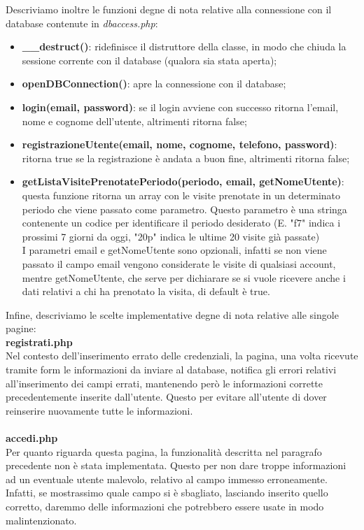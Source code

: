 Descriviamo inoltre le funzioni degne di nota relative alla connessione con il database contenute in \textit{dbaccess.php}:
\begin{itemize}
\item \textbf{\_\_destruct()}: ridefinisce il distruttore della classe, in modo che chiuda la sessione corrente con il database (qualora sia stata aperta);
\item \textbf{openDBConnection()}: apre la connessione con il database;
\item \textbf{login(email, password)}: se il login avviene con successo ritorna l'email, nome e cognome dell'utente, altrimenti ritorna false;
\item \textbf{registrazioneUtente(email, nome, cognome, telefono, password)}: ritorna true se la registrazione è andata a buon fine, altrimenti ritorna false;
\item \textbf{getListaVisitePrenotatePeriodo(periodo, email, getNomeUtente)}: questa funzione ritorna un array con le visite prenotate in un determinato periodo che viene passato come parametro. Questo parametro è una stringa contenente un codice per identificare il periodo desiderato (E. "f7" indica i prossimi 7 giorni da oggi, "20p" indica le ultime 20 visite già passate) \\I parametri email e getNomeUtente sono opzionali, infatti se non viene passato il campo email vengono considerate le visite di qualsiasi account, mentre getNomeUtente, che serve per dichiarare se si vuole ricevere anche i dati relativi a chi ha prenotato la visita, di default è true.
\end{itemize}

\pagebreak

Infine, descriviamo le scelte implementative degne di nota relative alle singole pagine: \\

\textbf{registrati.php} \\ 
Nel contesto dell'inserimento errato delle credenziali, la pagina, una volta ricevute tramite form le informazioni da inviare al database, notifica gli errori relativi all'inserimento dei campi errati, mantenendo però le informazioni corrette precedentemente inserite dall'utente. Questo per evitare all'utente di dover reinserire nuovamente tutte le informazioni. \\ \\

\textbf{accedi.php} \\ 
Per quanto riguarda questa pagina, la funzionalità descritta nel paragrafo precedente non è stata implementata. Questo per non dare troppe informazioni ad un eventuale utente malevolo, relativo al campo immesso erroneamente. Infatti, se mostrassimo quale campo si è sbagliato, lasciando inserito quello corretto, daremmo delle informazioni che potrebbero essere usate in modo malintenzionato. \\ \\

